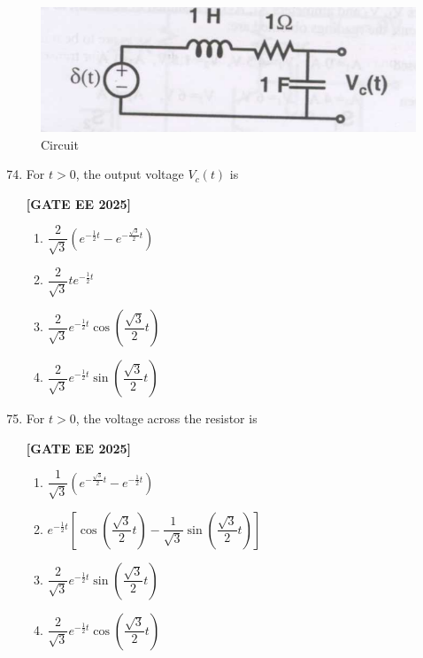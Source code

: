 \documentclass[12pt]{article}
\begin{document}
\begin{figure}[H]\centering
\includegraphics[width=0.6\columnwidth]{figs/q7475.png}
\caption{Circuit}
\label{fig:q7475}
\end{figure}

\begin{enumerate}[leftmargin=*, label=\textbf{Q.\arabic*:}]
\setcounter{enumi}{73}

\item For $t>0$, the output voltage $V_c(t)$ is
 
\noindent \textbf{[GATE EE 2025]}
\begin{multicols}{2}
\begin{enumerate}
  \item $\dfrac{2}{\sqrt{3}}\left(e^{-\frac{1}{2}t} - e^{-\frac{\sqrt{3}}{2}t}\right)$
  \item $\dfrac{2}{\sqrt{3}} t e^{-\frac{1}{2} t}$
  \item $\dfrac{2}{\sqrt{3}} e^{-\frac{1}{2} t} \cos\left( \dfrac{\sqrt{3}}{2} t \right)$
  \item $\dfrac{2}{\sqrt{3}} e^{-\frac{1}{2} t} \sin\left( \dfrac{\sqrt{3}}{2} t \right)$
\end{enumerate}
\end{multicols}

\item For $t>0$, the voltage across the resistor is
 
\noindent \textbf{[GATE EE 2025]}
\begin{multicols}{2}
\begin{enumerate}
  \item $\dfrac{1}{\sqrt{3}} \left( e^{-\frac{\sqrt{3}}{2} t} - e^{-\frac{1}{2} t} \right)$
  \item $e^{-\frac{1}{2} t} \left[ \cos \left( \dfrac{\sqrt{3}}{2} t \right) - \dfrac{1}{\sqrt{3}} \sin \left( \dfrac{\sqrt{3}}{2} t \right) \right]$
  \item $\dfrac{2}{\sqrt{3}} e^{-\frac{1}{2} t} \sin \left( \dfrac{\sqrt{3}}{2} t \right)$
  \item $\dfrac{2}{\sqrt{3}} e^{-\frac{1}{2} t} \cos \left( \dfrac{\sqrt{3}}{2} t \right)$
\end{enumerate}
\end{multicols}

\end{enumerate}
\end{document}
